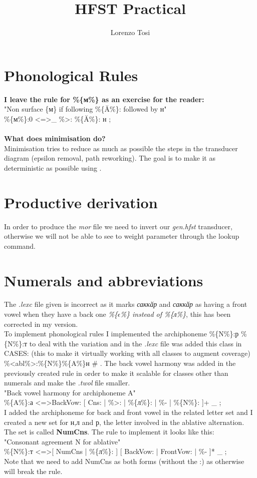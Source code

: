 \documentclass{hitec}
\author{Lorenzo Tosi}
\title{HFST Practical}
\begin{document}
	\maketitle
	\tableofcontents
	\section{Phonological Rules}
	\textbf{I leave the rule for \%\{м\%\} as an exercise for the reader:} \\
	"Non surface \{м\} if following \%\{Ă\%\}: followed by н" \\
	\%\{м\%\}:0 \textless=\textgreater \_ \%\textgreater: \%\{Ă\%\}: н ; \\
	\\
	\textbf{What does minimisation do?} \\
	Minimisation tries to reduce as much as possible the steps in the transducer diagram (epsilon removal, path reworking). The goal is to make it as deterministic as possible using .
	\section{Productive derivation}
	In order to produce the \textit{mor} file we need to invert our \textit{gen.hfst} transducer, otherwise we will not be able to see to weight parameter through the lookup command. 
	\section{Numerals and abbreviations}
	The \textit{.lexc} file given is incorrect as it marks \textit{саккӑр} and \textit{саккӑр} as having a front vowel when they have a back one \textit{\%\{$\epsilon$\%\} instead of \%\{л\%\}}, this has been corrected in my version. \\
	To implement phonological rules I implemented the archiphoneme \%\{N\%\}:р \%\{N\%\}:т to deal with the variation and in the \textit{.lexc} file was added this class in CASES: (this to make it virtually working with all classes to augment coverage) \%\textless abl\%\textgreater:\%\{N\%\}\%\{A\%\}н \# . The back vowel harmony was added in the previously created rule in order to make it scalable for classes other than numerals and make the \textit{.twol} file smaller. \\
	"Back vowel harmony for archiphoneme {A}"\\
	\%\{A\%\}:а \textless=\textgreater BackVow: [ Cns: | \%\textgreater: | \%\{л\%\}: | \%- | \%\{N\%\}: ]+ \_ ; \\
	I added the archiphoneme for back and front vowel in the related letter set and I created a new set for н,л and р, the letter involved in the ablative alternation. The set is called \textbf{NumCns}. The rule to implement it looks like this: \\
	"Consonant agreement {N} for ablative" \\
	\%\{N\%\}:т \textless=\textgreater [ NumCns | \%\{л\%\}: ] [ BackVow: | FrontVow: | \%- ]* \_ ; \\
	Note that we need to add NumCns as both forms (without the :) as otherwise will break the rule. 		
\end{document}
